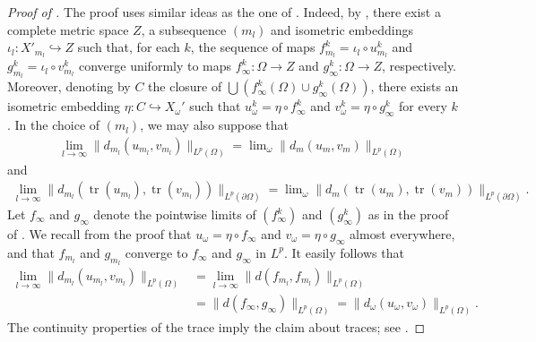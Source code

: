 \documentclass[a4paper,leqno]{amsart}
\numberwithin{equation}{section}
\theoremstyle{remark}
\theoremstyle{remark}
\DeclareMathOperator{\trace}{tr}
\begin{document}
\begin{proof}[Proof of ]
    The proof uses similar ideas as the one of . Indeed, by , there exist a complete metric space $Z$, a subsequence $(m_l)$ and isometric embeddings $\iota_l\colon X'_{m_l}\hookrightarrow Z$ such that, for each $k$, the sequence of maps $f_{m_l}^{k} = \iota_l\circ u_{m_l}^k$ and $g_{m_l}^k = \iota_l \circ v_{m_l}^k$ converge uniformly to maps $f_\infty^k\colon \Omega\to Z$ and $g_\infty^k \colon \Omega \to Z$, respectively. Moreover, denoting by $C$ the closure of $\bigcup (f_\infty^k(\Omega) \cup g_\infty^k(\Omega))$, there exists an isometric embedding $\eta\colon C\hookrightarrow X_\omega'$ such that $u_\omega^k = \eta\circ f_\infty^k$ and $v_\omega^k = \eta \circ g_\infty^k$ for every $k$. In the choice of $( m_l )$, we may also suppose that
    \begin{align*}
        \lim_{l \to\infty} \|d_{m_l}(u_{m_l}, v_{m_l})\|_{L^p(\Omega)} = \lim\nolimits_\omega \|d_m(u_m, v_m)\|_{L^p(\Omega)}
    \end{align*}
    and
    \begin{align*}
        \lim_{l \to\infty} \|d_{m_l}(\trace(u_{m_l}), \trace(v_{m_l}))\|_{L^p(\partial \Omega)} = \lim\nolimits_\omega \|d_m(\trace(u_m), \trace(v_m))\|_{L^p(\partial \Omega)}.
    \end{align*}
    Let $f_\infty$ and $g_\infty$ denote the pointwise limits of $( f_\infty^k )$ and $( g_\infty^k )$ as in the proof of . We recall from the proof that $u_\omega = \eta \circ f_\infty$ and $v_\omega = \eta \circ g_\infty$ almost everywhere, and that $f_{m_l}$ and $g_{m_l}$ converge to $f_\infty$ and $g_\infty$ in $L^p$. It easily follows that
    \begin{align*}
        \lim_{l \to\infty} \|d_{m_l}(u_{m_l}, v_{m_l})\|_{L^p(\Omega)}
        &=
        \lim_{l \to\infty} \|d(f_{m_l}, f_{m_l})\|_{L^p(\Omega)}
        \\
        &=
        \| d(f_\infty,g_\infty) \|_{L^{p}(\Omega)}
        =
        \| d_\omega( u_\omega, v_\omega ) \|_{L^{p}(\Omega)}.
    \end{align*}
    The continuity properties of the trace imply the claim about traces; see .
\end{proof}
\end{document}
